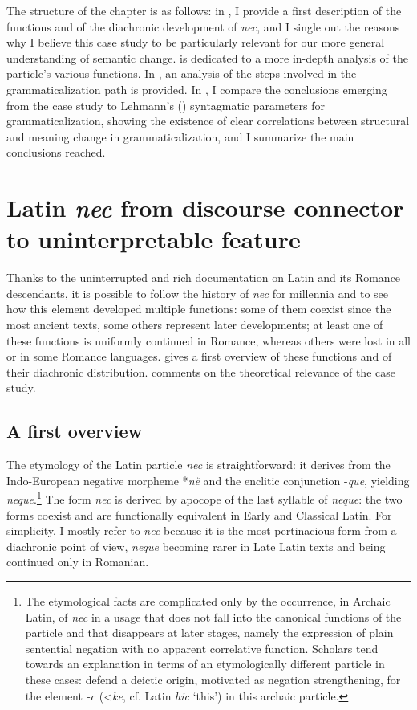 \documentclass[output=paper,modfonts,nonflat,citecolor=brown,
showindex
]{langsci/langscibook}
\begin{document}
The structure of the chapter is as follows: in , I provide a first description of the functions and of the diachronic development of {\emph{nec}}, and I single out the reasons why I believe this case study to be particularly relevant for our more general understanding of semantic change.  is dedicated to a more in-depth analysis of the particle's various functions. In , an analysis of the steps involved in the grammaticalization path is provided. In , I compare the  conclusions emerging from the case study to Lehmann's (\citeyear{Lehmann15}) syntagmatic parameters for grammaticalization, showing the existence of clear correlations between structural and meaning change in grammaticalization, and I summarize the main conclusions reached.

\section{Latin {\emph{nec}} from discourse connector to uninterpretable feature} \label{generalintro}

Thanks to the uninterrupted and rich documentation on Latin and its Romance descendants, it is possible to follow the history of {\emph{nec}} for millennia and to see how this element developed multiple functions: some of them coexist since the most ancient texts, some others represent later developments; at least one of these functions is uniformly continued in Romance, whereas others were lost in all or in some Romance languages.  gives a first overview of these functions and of their diachronic distribution.  comments on the theoretical relevance of the case study.


\subsection{A first overview} \label{corefacts}

The etymology of the Latin particle {\emph{nec}} is straightforward: it derives from the Indo-European negative morpheme *{\emph{n\u{e}}} and the enclitic conjunction -{\emph{que}}, yielding {\emph{neque}}.{\footnote{The etymological facts are complicated only by the occurrence, in Archaic Latin, of {\emph{nec}} in a usage that does not fall into the canonical functions of the particle and that disappears at later stages, namely the expression of plain sentential negation with no apparent correlative function. Scholars tend towards an explanation in terms of an etymologically different particle in these cases: \citet[29--30]{OrlandiniPoccetti07} defend a deictic origin, motivated as negation strengthening, for the element {\emph{-c}} (\textless *{\emph{ke}}, cf. Latin {\emph{hic}} `this') in this archaic particle.}} The form {\emph{nec}} is derived by apocope of the last syllable of {\emph{neque}}: the two forms coexist and are functionally equivalent in Early and Classical Latin. For simplicity, I mostly refer to {\emph{nec}} because it is the most pertinacious form from a diachronic point of view, {\emph{neque}} becoming rarer in Late Latin texts and being continued only in Romanian.
\end{document}
